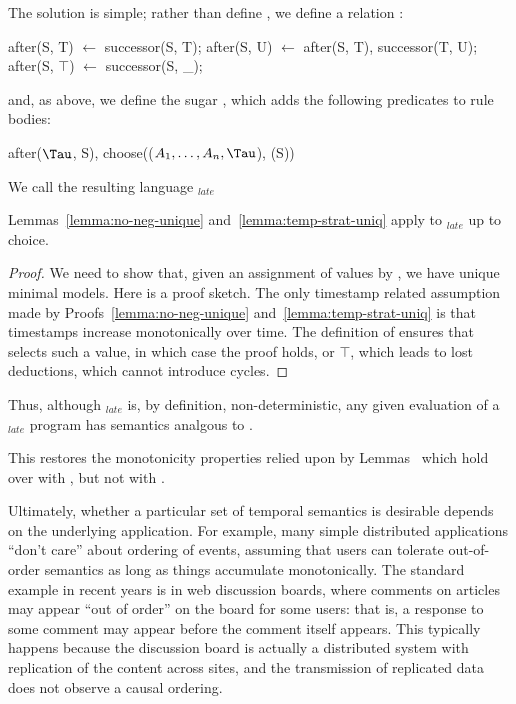 The solution is simple; rather than define , we define a relation :

\begin{Dedalus}
after(S, T) \(\leftarrow\) successor(S, T);
after(S, U) \(\leftarrow\) after(S, T), successor(T, U);
after(S, \(\top\)) \(\leftarrow\) successor(S, _);
\end{Dedalus}

and, as above, we define the sugar , which adds the
following predicates to rule bodies:

\begin{Dedalus}
after(\(\Tau\), S),
choose((\(A_1, \ldots, A_n, \Tau\)), (S))
\end{Dedalus}

We call the resulting language \lang$_{late}$


\begin{lemma}
Lemmas~\ref{lemma:no-neg-unique} and~\ref{lemma:temp-strat-uniq} apply
to \lang$_{late}$ up to choice.
\begin{proof}
We need to show that, given an assignment of values by
, we have unique minimal models.  Here is a proof
sketch.  The only timestamp related assumption made by
Proofs~\ref{lemma:no-neg-unique} and~\ref{lemma:temp-strat-uniq} is
that timestamps increase monotonically over time.  The definition of
 ensures that  selects such a value, in
which case the proof holds, or $\top$, which leads to lost deductions,
which cannot introduce cycles.
\end{proof}
\end{lemma}

Thus, although \lang$_{late}$ is, by definition, non-deterministic, any given evaluation of a \lang$_{late}$ program has semantics analgous to \slang.

This restores the monotonicity properties relied upon by
Lemmas~ which hold over \lang with , but
not with .

Ultimately, whether a particular set of temporal semantics is
desirable depends on the underlying application.  For example, many simple distributed applications ``don't care'' about ordering of events, assuming that users can tolerate out-of-order semantics as long as things accumulate monotonically.  The standard example in recent years is in web discussion boards, where comments on articles may appear ``out of order'' on the board for some users: that is, a response to some comment may appear before the comment itself appears.  This typically happens because the discussion board is actually a distributed system with replication of the content across sites, and the transmission of replicated data does not observe a causal ordering.

